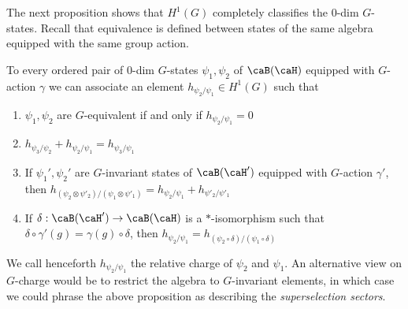 The next proposition shows that $H^1(G)$ completely classifies the $0$-dim $G$-states. Recall that equivalence is defined between states of the same algebra equipped with the same group action. 
\begin{proposition}\label{prop: zerodim}
	To every ordered pair of $0$-dim $G$-states $\psi_1,\psi_2$ of $\caB(\caH)$ equipped with $G$-action $\gamma$ we can associate an element $h_{\psi_2/\psi_1} \in H^1(G)$ such that 
	\begin{enumerate}
		\item $\psi_1,\psi_2$ are $G$-equivalent if and only if  $h_{\psi_2/\psi_1}=0$
		\item $h_{\psi_3/\psi_2}+h_{\psi_2/\psi_1}=h_{\psi_3/\psi_1}$
		\item If $\psi_1',\psi_2'$ are $G$-invariant states of $\caB(\caH')$ equipped with $G$-action $\gamma'$, then $h_{(\psi_2 \otimes \psi'_2)/(\psi_1 \otimes \psi'_1)}= h_{\psi_2/\psi_1}+ h_{\psi'_2/\psi'_1}$
		\item If $\delta:\caB(\caH')\to \caB(\caH) $ is a $*$-isomorphism such that $\delta\circ\gamma'(g)=\gamma(g)\circ\delta$, then $h_{\psi_2/\psi_1}= h_{(\psi_2\circ\delta)/(\psi_1\circ\delta)}$
	\end{enumerate} 
\end{proposition}
We call henceforth $h_{\psi_2/\psi_1}$ the relative charge of $\psi_2$ and $\psi_1$. 
An alternative view on $G$-charge would be to restrict the algebra to $G$-invariant elements, in which case we could phrase the above proposition as describing the \emph{superselection sectors}.
